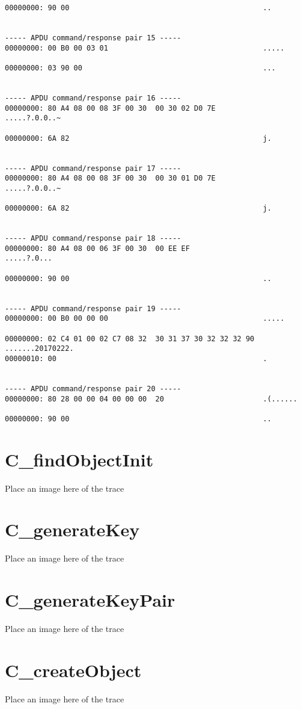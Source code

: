 \documentclass[bsc,frontabs,twoside,singlespacing,parskip,deptreport]{infthesis}     %
\begin{document}
\begin{verbatim}
00000000: 90 00                                             ..


----- APDU command/response pair 15 -----
00000000: 00 B0 00 03 01                                    .....

00000000: 03 90 00                                          ...


----- APDU command/response pair 16 -----
00000000: 80 A4 08 00 08 3F 00 30  00 30 02 D0 7E           .....?.0.0..~

00000000: 6A 82                                             j.


----- APDU command/response pair 17 -----
00000000: 80 A4 08 00 08 3F 00 30  00 30 01 D0 7E           .....?.0.0..~

00000000: 6A 82                                             j.


----- APDU command/response pair 18 -----
00000000: 80 A4 08 00 06 3F 00 30  00 EE EF                 .....?.0...

00000000: 90 00                                             ..


----- APDU command/response pair 19 -----
00000000: 00 B0 00 00 00                                    .....

00000000: 02 C4 01 00 02 C7 08 32  30 31 37 30 32 32 32 90  .......20170222.
00000010: 00                                                .


----- APDU command/response pair 20 -----
00000000: 80 28 00 00 04 00 00 00  20                       .(...... 

00000000: 90 00                                             ..

\end{verbatim}
\section{C\_findObjectInit}
Place an image here of the trace
\section{C\_generateKey}
Place an image here of the trace
\section{C\_generateKeyPair}
Place an image here of the trace
\section{C\_createObject}
Place an image here of the trace
\end{document}

